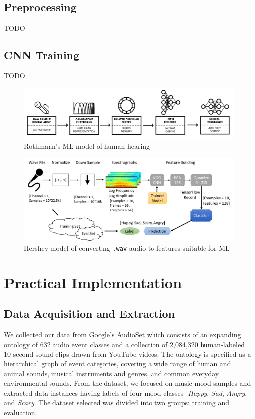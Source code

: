\documentclass{article}
\begin{document}
\subsection{Preprocessing}

TODO

\subsection{CNN Training}

TODO

\begin{figure}[]
	\centering
	\includegraphics[width=1.0\textwidth]{Rothmann_Flow.png}  
	\caption{Rothmann's	\cite{rothmann} ML model of human hearing}
	\label{fig:rothman_flow}
\end{figure}

\begin{figure}[]
	\centering
	\includegraphics[width=1.0\textwidth]{VGG Flow.png}  
	\caption{Hershey \cite{hershey} model of converting \texttt{.wav} audio to features suitable for ML}
	\label{fig:vgg_flow}
\end{figure}
	
\section{Practical Implementation}

\subsection{Data Acquisition and Extraction}

We collected our data from Google’s AudioSet \cite{audioset} which consists of an expanding ontology of 632 audio event classes and a collection of 2,084,320 human-labeled 10-second sound clips drawn from YouTube videos. The ontology is specified as a hierarchical graph of event categories, covering a wide range of human and animal sounds, musical instruments and genres, and common everyday environmental sounds. From the dataset, we focused on music mood samples and extracted data instances having labels of four mood classes- \textit{Happy}, \textit{Sad}, \textit{Angry}, and \textit{Scary}. The dataset selected was divided into two groups: training and evaluation. 
\end{document}
